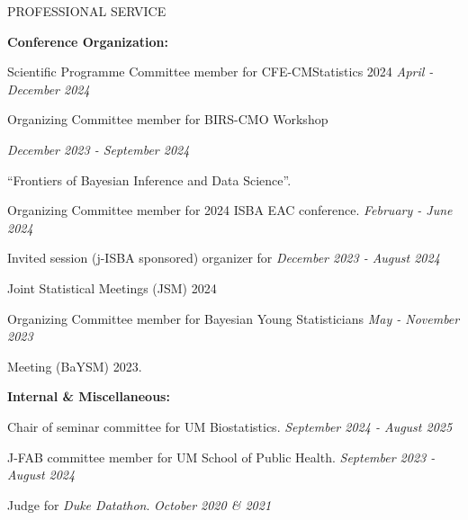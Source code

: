 \documentclass{resume} %
\newcommand{\thisYear}[1]{
	#1
}
\begin{document}
\begin{rSection}{PROFESSIONAL SERVICE}
    \medskip 

 \hspace*{-0.2in}\textbf{Conference Organization:}
 
 Scientific Programme Committee member for CFE-CMStatistics 2024 \hfill {\em April - December 2024}
 
 Organizing Committee member for BIRS-CMO Workshop	\hfill {\em December 2023 - September 2024
 
\vspace{-0.1in}

``Frontiers of Bayesian Inference and Data Science''. 
}

 
\smallskip 
 
Organizing Committee member for 2024 ISBA EAC conference. 	\hfill {\em February - June 2024}
	
\smallskip

Invited session (j-ISBA sponsored) organizer for  \hfill  {\em December 2023 - August 2024}

\vspace{-0.1in}

Joint Statistical Meetings (JSM) 2024

\smallskip
	
Organizing Committee member for Bayesian Young Statisticians  \hfill {\em May - November 2023}

\vspace{-0.1in}
Meeting (BaYSM) 2023.


 \hspace*{-0.2in}\textbf{Internal \& Miscellaneous: }
 
 Chair of seminar committee for UM Biostatistics. \hfill {\em September 2024 - August 2025}
 
 J-FAB committee member for UM School of Public Health.  \hfill {\em September 2023 - August 2024}

Judge for \emph{Duke Datathon}.  \hfill {\em October 2020 \& 2021}








\end{rSection}
\end{document}
